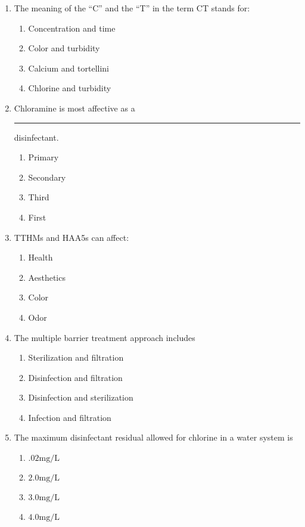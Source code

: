 \documentclass{article}
\begin{document}
\begin{enumerate}
\item The meaning of the “C” and the “T” in the term CT stands for:
\begin{enumerate}
\item Concentration and time
\item Color and turbidity
\item Calcium and tortellini
\item Chlorine and turbidity
\end{enumerate}

\item Chloramine is most affective as a \rule{1cm}{0.5pt} disinfectant.
\begin{enumerate}
\item Primary
\item Secondary
\item Third
\item First
\end{enumerate}

\item TTHMs and HAA5s can affect:
\begin{enumerate}
\item Health
\item Aesthetics
\item Color
\item Odor
\end{enumerate}

\item  The multiple barrier treatment approach includes\\
\begin{enumerate}
\item Sterilization and filtration\\
\item Disinfection and filtration\\
\item Disinfection and sterilization\\
\item Infection and filtration
\end{enumerate}

\item The maximum disinfectant residual allowed for chlorine in a water system is\\
\begin{enumerate}
\item $.02 \mathrm{mg} / \mathrm{L}$\\
\item $2.0 \mathrm{mg} / \mathrm{L}$\\
\item $3.0 \mathrm{mg} / \mathrm{L}$\\
\item $4.0 \mathrm{mg} / \mathrm{L}$
\end{enumerate}


\end{enumerate}
\end{document}
